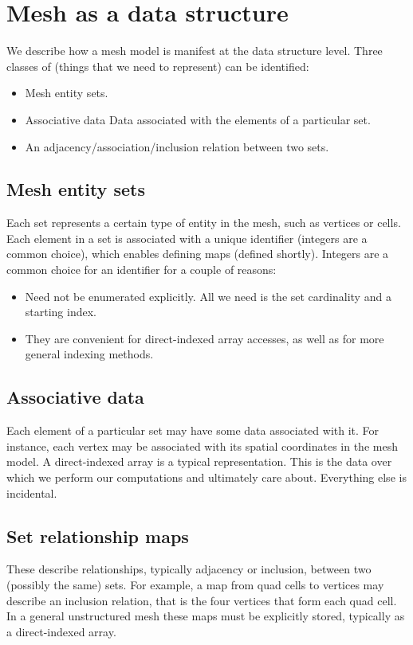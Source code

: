 
\section{Mesh as a data structure}

We describe how a mesh model is manifest at the data structure level. Three classes of (things that we need to represent) can be identified:
\begin{itemize}
\item Mesh entity sets.
\item Associative data
Data associated with the elements of a particular set.
\item An adjacency/association/inclusion relation between two sets.
\end{itemize}


\subsection{Mesh entity sets}
Each set represents a certain type of entity in the mesh, such as vertices or cells. Each element in a set is associated with a unique identifier (integers are a common choice), which enables defining maps (defined shortly). Integers are a common choice for an identifier for a couple of reasons:
\begin{itemize}
\item Need not be enumerated explicitly. All we need is the set cardinality and a starting index.
\item They are convenient for direct-indexed array accesses, as well as for more general indexing methods.
\end{itemize}

\subsection{Associative data}
Each element of a particular set may have some data associated with it. For instance, each vertex may be associated with its spatial coordinates in the mesh model. A direct-indexed array is a typical representation.
This is the data over which we perform our computations and ultimately care about. Everything else is incidental.

\subsection{Set relationship maps}
These describe relationships, typically adjacency or inclusion, between two (possibly the same) sets. For example, a map from quad cells to vertices may describe an inclusion relation, that is the four vertices that form each quad cell. In a general unstructured mesh these maps must be explicitly stored, typically as a direct-indexed array.



